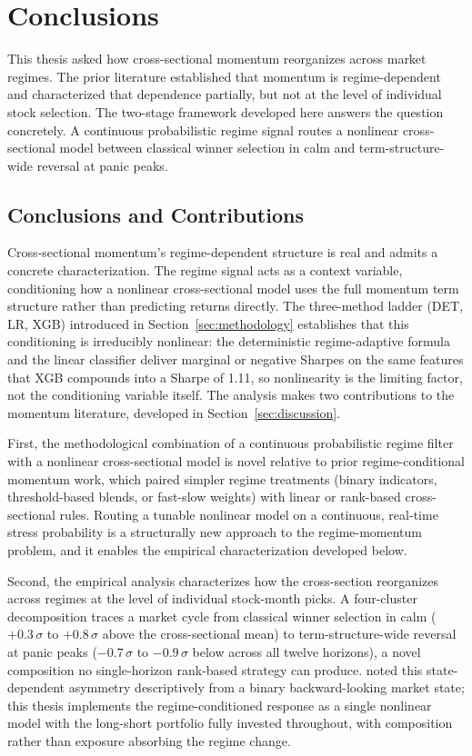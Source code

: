 \newpage
\section{Conclusions}\label{sec:conclusion}

This thesis asked how cross-sectional momentum reorganizes across market regimes. The prior literature established that momentum is regime-dependent and characterized that dependence partially, but not at the level of individual stock selection. The two-stage framework developed here answers the question concretely. A continuous probabilistic regime signal routes a nonlinear cross-sectional model between classical winner selection in calm and term-structure-wide reversal at panic peaks.

\subsection{Conclusions and Contributions}\label{sec:conclusions_contributions}
Cross-sectional momentum's regime-dependent structure is real and admits a concrete characterization. The regime signal acts as a context variable, conditioning how a nonlinear cross-sectional model uses the full momentum term structure rather than predicting returns directly. The three-method ladder (DET, LR, XGB) introduced in Section~\ref{sec:methodology} establishes that this conditioning is irreducibly nonlinear: the deterministic regime-adaptive formula and the linear classifier deliver marginal or negative Sharpes on the same features that XGB compounds into a Sharpe of 1.11, so nonlinearity is the limiting factor, not the conditioning variable itself. The analysis makes two contributions to the momentum literature, developed in Section~\ref{sec:discussion}.

First, the methodological combination of a continuous probabilistic regime filter with a nonlinear cross-sectional model is novel relative to prior regime-conditional momentum work, which paired simpler regime treatments (binary indicators, threshold-based blends, or fast-slow weights) with linear or rank-based cross-sectional rules. Routing a tunable nonlinear model on a continuous, real-time stress probability is a structurally new approach to the regime-momentum problem, and it enables the empirical characterization developed below.

Second, the empirical analysis characterizes how the cross-section reorganizes across regimes at the level of individual stock-month picks. A four-cluster decomposition traces a market cycle from classical winner selection in calm ($+0.3\,\sigma$ to $+0.8\,\sigma$ above the cross-sectional mean) to term-structure-wide reversal at panic peaks ($-0.7\,\sigma$ to $-0.9\,\sigma$ below across all twelve horizons), a novel composition no single-horizon rank-based strategy can produce. \citet{Cooper2004} noted this state-dependent asymmetry descriptively from a binary backward-looking market state; this thesis implements the regime-conditioned response as a single nonlinear model with the long-short portfolio fully invested throughout, with composition rather than exposure absorbing the regime change. 

